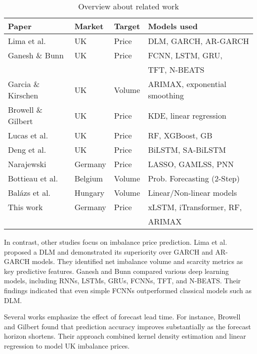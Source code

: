 \documentclass[class=scrbook, crop=false]{standalone}
\begin{document}
\begin{table}[h]

    \centering
\begin{tabular}{l|l|l|l}
Paper & Market & Target & Models used   \\\hline
Lima et al.  \cite{limaBayesianPredictiveDistributions2023}	&UK	&Price	&DLM, GARCH, AR-GARCH	 \\
Ganesh \& Bunn  \cite{ganeshForecastingImbalancePrice2024}	 &UK&Price	&FCNN, LSTM, GRU, \\
& & &  TFT, N-BEATS \\
Garcia \& Kirschen  \cite{garciaForecastingSystemImbalance2006}	&UK	&Volume&	ARIMAX, exponential smoothing	 \\
Browell \& Gilbert \cite{browellPredictingElectricityImbalance2022}&	UK&	Price	&KDE, linear regression	 \\
Lucas et al.  \cite{lucasPriceForecastingBalancing2020}&UK&	Price	&RF, XGBoost, GB	 \\
Deng et al.  \cite{dengSeasonalityDeepLearning2024}	&UK	& Price	&BiLSTM, SA-BiLSTM\\
Narajewski \cite{narajewskiProbabilisticForecastingGerman2022}&Germany&	Price	&LASSO, GAMLSS, PNN		 \\
Bottieau et al.  \cite{bottieauVeryShortTermProbabilisticForecasting2020}&	Belgium	&Volume&Prob. Forecasting (2-Step)		\\
Balázs et al. \cite{balazsShorttermSystemImbalance2024}	&Hungary&	Volume	&Linear/Non-linear models\\
This work	&Germany&	 Price&	xLSTM, iTransformer, RF, \\
&&&ARIMAX\\
\end{tabular}
\caption{Overview about related work}
\label{Table::Related_Work}
\end{table}


In contrast, other studies focus on imbalance price prediction. Lima et al. \cite{limaBayesianPredictiveDistributions2023} proposed a \gls{DLM} and demonstrated its superiority over GARCH and AR-GARCH models. They identified net imbalance volume and scarcity metrics as key predictive features. Ganesh and Bunn  \cite{ganeshForecastingImbalancePrice2024} compared various deep learning models, including RNNs, LSTMs, GRUs, FCNNs, \gls{TFT}, and N-BEATS. Their findings indicated that even simple FCNNs outperformed classical models such as \gls{DLM}.

Several works emphasize the effect of forecast lead time. For instance, Browell and Gilbert \cite{browellPredictingElectricityImbalance2022} found that prediction accuracy improves substantially as the forecast horizon shortens. Their approach combined kernel density estimation and linear regression to model UK imbalance prices.
\end{document}
